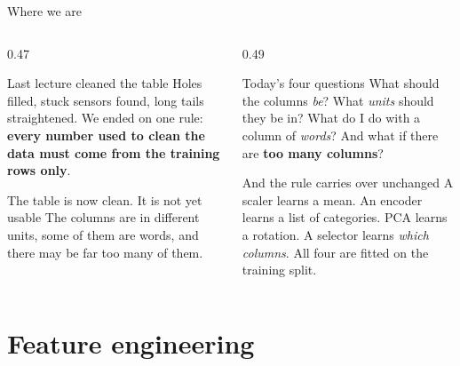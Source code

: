 \documentclass[aspectratio=169]{beamer}
\begin{document}
\begin{frame}[shrink=5]{Where we are}
  \begin{columns}[T]
    \begin{column}{0.47\textwidth}
      \begin{block}{Last lecture cleaned the table}
        Holes filled, stuck sensors found, long tails straightened. We ended
        on one rule: \textbf{every number used to clean the data must come
        from the training rows only}.
      \end{block}
      \begin{block}{The table is now clean. It is not yet usable}
        The columns are in different units, some of them are words, and there
        may be far too many of them.
      \end{block}
    \end{column}
    \begin{column}{0.49\textwidth}
      \begin{exampleblock}{Today's four questions}
        What should the columns \emph{be}? What \emph{units} should they be
        in? What do I do with a column of \emph{words}? And what if there are
        \textbf{too many columns}?
      \end{exampleblock}
      \begin{alertblock}{And the rule carries over unchanged}
        A scaler learns a mean. An encoder learns a list of categories. PCA
        learns a rotation. A selector learns \emph{which columns}. All four
        are fitted on the training split.
      \end{alertblock}
    \end{column}
  \end{columns}
\end{frame}

\section[Engineering]{Feature engineering}
\label{sec:fe}
\end{document}
